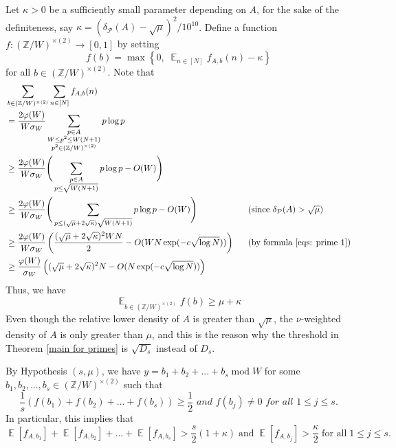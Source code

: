 \documentclass[11pt]{amsart}
\theoremstyle{plain} %
\theoremstyle{remark}
\numberwithin{equation}{section}
\newcommand{\E}{\mathop{\mathbb{E}}}
\newcommand{\Z}{\mathbb{Z}}
\begin{document}
Let $\kappa>0$ be a sufficiently small parameter depending on $A$, for the sake of the definiteness, say $\kappa=(\delta_{\mathcal{P}}(A)-\sqrt{\mu})^2/10^{10}$. Define a function $f:(\Z/W)^{\times(2)}\longrightarrow[0,1]$ by setting
\begin{equation*}
    f(b)=\max\left\{0,\;\E_{n\in [N]}f_{A,b}(n)-\kappa\right\}
\end{equation*}
for all $b\in (\Z/W)^{\times(2)}$. Note that
\begin{equation*}
    \begin{split}
        &\sum_{b\in (\Z/W)^{\times(2)}}\sum_{n\in [N]}f_{A,b}(n)\\
        &=\frac{2\varphi(W)}{W\sigma_W}\sum_{\substack{p\in A\\W\leq p^2\leq W(N+1)\\p^2\in (\Z/W)^{\times(2)}}}p\log p\\
        &\geq \frac{2\varphi(W)}{W\sigma_W}\Bigg(\sum_{\substack{p\in A\\p\leq \sqrt{W(N+1)}}}p\log p-O(W)\Bigg)\\
        &\geq \frac{2\varphi(W)}{W\sigma_W}\Bigg(\sum_{p\leq (\sqrt{\mu}+2\sqrt{\kappa})\sqrt{W(N+1)}}p\log p-O(W)\Bigg)\;\;\;\quad\quad\quad\quad\quad\text{(since $\delta_{\mathcal{P}}(A)>\sqrt{\mu}$)}\\
        &\geq \frac{2\varphi(W)}{W\sigma_W}\left(\frac{(\sqrt{\mu}+2\sqrt{\kappa})^2WN}{2}-O(WN\exp(-c\sqrt{\log N}))\right)\;\;\quad\text{(by formula \eqref{eqs: prime 1})}\\
        &\geq \frac{\varphi(W)}{\sigma_W}\left((\sqrt{\mu}+2\sqrt{\kappa})^2N-O(N\exp(-c\sqrt{\log N}))\right)
    \end{split}
\end{equation*}
Thus, we have
\begin{equation*}
    \E_{b\in (\Z/W)^{\times(2)}}f(b)\geq \mu+\kappa
\end{equation*}
Even though the relative lower density of $A$ is greater than $\sqrt{\mu}$, the $\nu$-weighted density of $A$ is only greater than $\mu$, and this is the reason why the threshold in Theorem \ref{main for primes} is $\sqrt{D_s}$ instead of $D_s$.

By Hypothesis $(s,\mu)$, we have $y=b_1+b_2+...+b_s\;\mathrm{mod}\;W$ for some $b_1,b_2,...,b_s\in (\Z/W)^{\times(2)}$ such that
\begin{equation*}
    \textit{$\frac{1}{s}(f(b_1)+f(b_2)+...+f(b_s))\geq \frac{1}{2}$ and $f(b_j)\neq 0$ for all $1\leq j \leq s$.}
\end{equation*}
In particular, this implies that
\begin{equation*}
    \E[f_{A,b_1}]+\E[f_{A,b_2}]+...+\E[f_{A,b_s}]>\frac{s}{2}(1+\kappa)\;\text{and}\;\E[f_{A,b_j}]>\frac{\kappa}{2}\;\text{for all}\;1\leq j\leq s.
\end{equation*}
\end{document}
